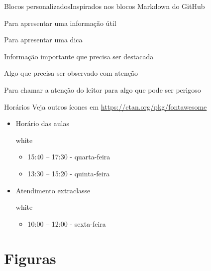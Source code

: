 \documentclass[aspectratio=169]{beamer}
\begin{document}
\begin{frame}[allowframebreaks]{Blocos personalizados}{Inspirados nos blocos Markdown do GitHub}
\begin{nota}
    Para apresentar uma informação útil
\end{nota}

\begin{tip}
    Para apresentar uma dica
\end{tip}

\begin{important}
    Informação importante que precisa ser destacada
\end{important}

\begin{warning}
    Algo que precisa ser observado com atenção
\end{warning}

\begin{caution}
    Para chamar a atenção do leitor para algo que pode ser perigoso
\end{caution}
\end{frame}


\begin{frame}{Horários}
    {Veja outros ícones em \url{https://ctan.org/pkg/fontawesome}}
    \begin{itemize}
        \item Horário das aulas 
        \begin{caixa}[azul]{white}{\faCalendarDays[regular]}
            \begin{itemize}
                \item 15:40 -- 17:30 - quarta-feira
                \item 13:30 -- 15:20 - quinta-feira
            \end{itemize}
        \end{caixa}
        \item Atendimento extraclasse
        \begin{caixa}[azul]{white}{\faCalendarDays[regular]}
            \begin{itemize}
                \item 10:00 -- 12:00 - sexta-feira
            \end{itemize}
        \end{caixa}
    \end{itemize}
\end{frame}


\section{Figuras}
\end{document}
